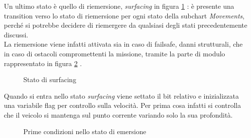 \documentclass{article}
\begin{document}
            Un ultimo stato è quello di riemersione, \emph{surfacing} in figura \ref{fig:surf} : è presente una transition verso lo stato di riemersione per ogni stato della subchart \emph{Movements},
            perché si potrebbe decidere di riemergere da qualsiasi degli stati precedentemente discussi.\\
            La riemersione viene infatti attivata sia in caso 
            di failsafe, danni strutturali, che in caso di ostacoli compromettenti la missione, tramite la parte di modulo rappresentato in figura \ref{fig:wall} .

            \begin{figure} [ht]
                \caption{Stato di surfacing}
                \label{fig:surf}
            \end{figure}

            Quando si entra nello stato \emph{surfacing} viene settato il bit relativo e inizializzata una variabile flag per controllo sulla velocità.
            Per prima cosa infatti si controlla che il veicolo si mantenga sul punto corrente variando solo la sua profondità.

            \begin{figure} [ht]
                \caption{Prime condizioni nello stato di emersione}
                \label{fig:wall}
            \end{figure}
\end{document}
